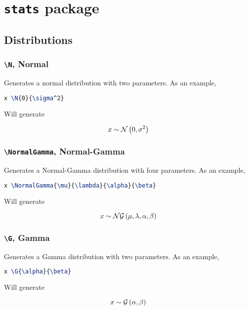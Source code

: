 \documentclass[]{article}
\title{}
\author{}
\begin{document}
\maketitle

\begin{abstract}

\end{abstract}

\section{\texttt{stats} package}

\subsection{Distributions}

\subsubsection{\texttt{\textbackslash N}, Normal}

Generates a normal distribution with two parameters.
As an example,

\begin{lstlisting}[language=TeX]
x \N{0}{\sigma^2}
\end{lstlisting}

Will generate

\[ x \sim \mathcal{N} \left( 0,\sigma^2 \right) \]

\subsubsection{\texttt{\textbackslash NormalGamma}, Normal-Gamma}

Generates a Normal-Gamma distribution with four parameters.
As an example,

\begin{lstlisting}[language=TeX]
x \NormalGamma{\mu}{\lambda}{\alpha}{\beta}
\end{lstlisting}

Will generate

\[ x \sim \mathcal{NG} \left(\mu,\lambda,\alpha,\beta\right) \]

\subsubsection{\texttt{\textbackslash G}, Gamma}

Generates a Gamma distribution with two parameters.
As an example,

\begin{lstlisting}[language=TeX]
x \G{\alpha}{\beta}
\end{lstlisting}

Will generate

\[ x \sim \mathcal{G} \left(\alpha,\beta\right) \]
\end{document}
